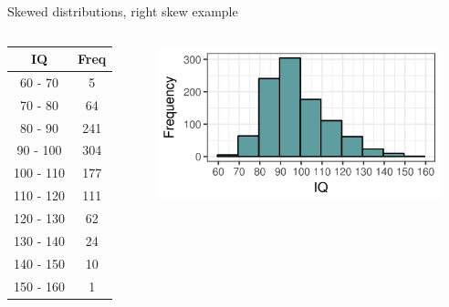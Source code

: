 \documentclass[xcolor=table, aspectratio=169, bigger]{beamer}
\begin{document}
\begin{frame}{Skewed distributions, right skew example}

\begin{columns}
\begin{column}{0.35\textwidth}
\begin{exampleblock}{}
\begin{center}
\begin{tabular}{cc}
IQ & Freq \\
\hline
60 - 70 & 5 \\
70 - 80 & 64 \\
80 - 90 & 241 \\
90 - 100 & 304 \\
100 - 110 & 177 \\
110 - 120 & 111 \\
120 - 130 & 62 \\
130 - 140 & 24 \\
140 - 150 & 10 \\
150 - 160 & 1 \\
\end{tabular}
\end{center}
\end{exampleblock}
\end{column}
\pause
\begin{column}{0.65\textwidth}
\begin{center}
\includegraphics[width=3.25in]{../images/wk04_iq_right_hist}

\end{center}
\end{column}
\end{columns}

\end{frame}
\end{document}
